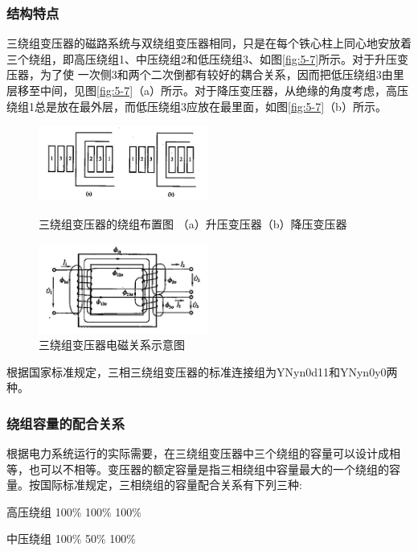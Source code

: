 \documentclass{book}
\begin{document}
\subsubsection{结构特点}

三绕组变压器的磁路系统与双绕组变压器相同，只是在每个铁心柱上同心地安放着三个绕组，即高压绕组1、中压绕组2和低压绕组3、如图\ref{fig:5-7}所示。对于升压变压器，为了使 一次侧3和两个二次倒都有较好的耦合关系，因而把低压绕组3由里层移至中间，见图\ref{fig:5-7}（a）所示。对于降压变压器，从绝缘的角度考虑，高压绕组1总是放在最外层，而低压绕组3应放在最里面，如图\ref{fig:5-7}（b）所示。
\begin{figure}  
	\begin{minipage}[H]{0.45\linewidth}  
		\centering  
		\includegraphics[width=2.2in]{5-7.png}  
		\caption{三绕组变压器的绕组布置图
			（a）升压变压器（b）降压变压器}  
		\label{fig:5-7}  
	\end{minipage}
	\begin{minipage}[H]{0.45\linewidth}  
		\centering  
		\includegraphics[width=2.2in]{5-8.png}  
		\caption{三绕组变压器电磁关系示意图}  
		\label{fig:5-8}  
	\end{minipage}  
\end{figure}
根据国家标准规定，三相三绕组变压器的标准连接组为YNyn0d11和YNyn0y0两种。

\subsubsection{绕组容量的配合关系 }

根据电力系统运行的实际需要，在三绕组变压器中三个绕组的容量可以设计成相等，也可以不相等。变压器的额定容量是指三相绕组中容量最大的一个绕组的容量。按国际标准规定，三相绕组的容量配合关系有下列三种:

高压绕组	100\%   	100\%	100\%

中压绕组	100\%	    50\%	100\%
\end{document}
